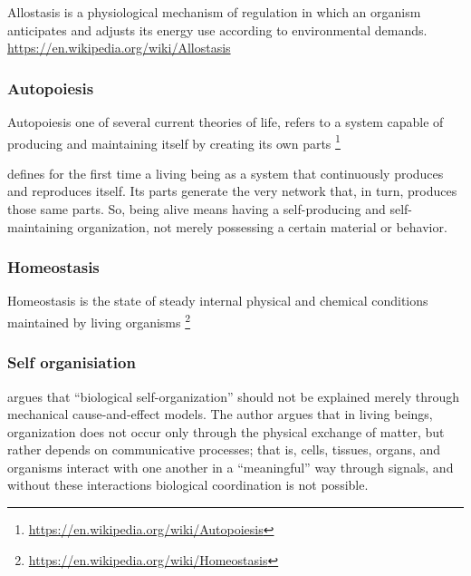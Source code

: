 \documentclass{book}
\providecommand{\seeherefooter}[1]{\footnote{\url{#1}}}
\begin{document}

Allostasis is a physiological mechanism of regulation in which an organism anticipates and adjusts its energy use according to environmental demands. \url{https://en.wikipedia.org/wiki/Allostasis}

\subsubsection{Autopoiesis}


Autopoiesis one of several current theories of life, refers to a system capable of producing and maintaining itself by creating its own parts
    \seeherefooter{https://en.wikipedia.org/wiki/Autopoiesis}
    
    \cite{maturana-varela-1980-autopoiesis-and-cognition-the-realization-of-the-living}
    defines for the first time a living being as a system that continuously produces and reproduces itself. Its parts generate the very network that, in turn, produces those same parts.
    So, being alive means having a self-producing and self-maintaining organization, not merely possessing a certain material or behavior.

\subsubsection{Homeostasis}


Homeostasis is the state of steady internal physical and chemical conditions maintained by living organisms
    \seeherefooter{https://en.wikipedia.org/wiki/Homeostasis}

\subsubsection{Self organisiation}


\cite{witzany-2014-biological-self-organization} argues that “biological self-organization” should not be explained merely through mechanical cause-and-effect models. The author argues that in living beings, organization does not occur only through the physical exchange of matter, but rather depends on communicative processes; that is, cells, tissues, organs, and organisms interact with one another in a “meaningful” way through signals, and without these interactions biological coordination is not possible.
    
\end{document}
